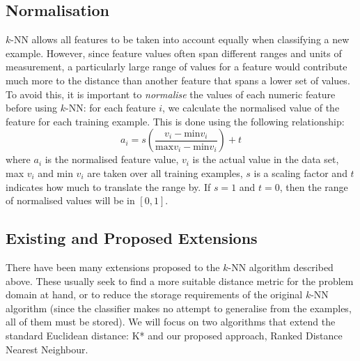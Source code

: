 \documentclass{article}
\begin{document}
\subsection{Normalisation}
$k$-NN allows all features to be taken
into account equally when classifying a new example. However, since feature
values often span different ranges and units of measurement, a particularly
large range of values for a feature would contribute much more to the distance
than another feature that spans a lower set of values.
To avoid this, it is important to \textit{normalise} the
values of each numeric feature before using $k$-NN: for each feature $i$, we
calculate the normalised value of the feature for each training example. This
is done using the following relationship:
\begin{equation}
\label{eq:normalise}
a_i = s\left(\dfrac{v_i - \mathrm{min }v_i}{\mathrm{max }v_i - \mathrm{min }v_i}\right) + t
\end{equation}
where $a_i$ is the normalised feature value, $v_i$ is the actual value in the
data set, max $v_i$ and min $v_i$ are taken over all training examples, $s$ is
a scaling factor and $t$ indicates how much to translate the range by. If $s=1$
and $t=0$, then the range of normalised values will be in $[0,1]$.

\subsection{Existing and Proposed Extensions}
There have been many extensions proposed to the $k$-NN algorithm described
above. These usually seek to find a more suitable distance metric for the
problem domain at hand, or to reduce the storage requirements of the original
$k$-NN algorithm (since the classifier makes no attempt to generalise from the
examples, all of them must be stored).
We will focus on two algorithms that extend the standard Euclidean distance:
K* and our proposed approach, Ranked Distance Nearest Neighbour.
\end{document}

